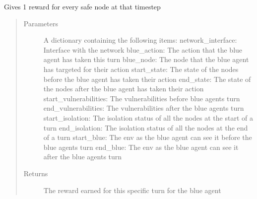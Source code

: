 \documentclass[letterpaper,10pt,english]{sphinxmanual}
\begin{document}
\begin{fulllineitems}
\label{\detokenize{source/yawning_titan.envs.generic.core:yawning_titan.envs.generic.core.reward_functions.safe_nodes_give_rewards}}
\sphinxAtStartPar
Gives 1 reward for every safe node at that timestep
\begin{quote}\begin{description}
\item[{Parameters}] \leavevmode
\sphinxAtStartPar
{} \textendash{} A dictionary containing the following items:
network\_interface: Interface with the network
blue\_action: The action that the blue agent has taken this turn
blue\_node: The node that the blue agent has targeted for their action
start\_state: The state of the nodes before the blue agent has taken their action
end\_state: The state of the nodes after the blue agent has taken their action
start\_vulnerabilities: The vulnerabilities before blue agents turn
end\_vulnerabilities: The vulnerabilities after the blue agents turn
start\_isolation: The isolation status of all the nodes at the start of a turn
end\_isolation: The isolation status of all the nodes at the end of a turn
start\_blue: The env as the blue agent can see it before the blue agents turn
end\_blue: The env as the blue agent can see it after the blue agents turn

\item[{Returns}] \leavevmode
\sphinxAtStartPar
The reward earned for this specific turn for the blue agent

\end{description}\end{quote}

\end{fulllineitems}

\end{document}
